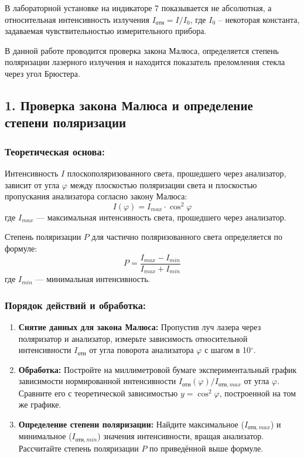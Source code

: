 В лабораторной установке на индикаторе 7 показывается не абсолютная, а относительная интенсивность излучения $I_{\text{отн}} = I/I_0$, где $I_0$ -- некоторая константа, задаваемая чувствительностью измерительного прибора.

\newpage
{}
В данной работе проводится проверка закона Малюса, определяется степень поляризации лазерного излучения и находится показатель преломления стекла через угол Брюстера.

\subsection*{1. Проверка закона Малюса и определение степени поляризации}

\subsubsection*{Теоретическая основа:}
Интенсивность $I$ плоскополяризованного света, прошедшего через анализатор, зависит от угла $\varphi$ между плоскостью поляризации света и плоскостью пропускания анализатора согласно закону Малюса:
\[ I(\varphi) = I_{max} \cdot \cos^2{\varphi} \]
где $I_{max}$ --- максимальная интенсивность света, прошедшего через анализатор.

Степень поляризации $P$ для частично поляризованного света определяется по формуле:
\[ P = \frac{I_{max} - I_{min}}{I_{max} + I_{min}} \]
где $I_{min}$ --- минимальная интенсивность.

\subsubsection*{Порядок действий и обработка:}
\begin{enumerate}
    \item \textbf{Снятие данных для закона Малюса:} Пропустив луч лазера через поляризатор и анализатор, измерьте зависимость относительной интенсивности $I_\text{отн}$ от угла поворота анализатора $\varphi$ с шагом в 10$^\circ$.
    
    \item \textbf{Обработка:} Постройте на миллиметровой бумаге экспериментальный график зависимости нормированной интенсивности $I_\text{отн}(\varphi)/I_{\text{отн}, max}$ от угла $\varphi$. Сравните его с теоретической зависимостью $y = \cos^2{\varphi}$, построенной на том же графике.
    
    \item \textbf{Определение степени поляризации:} Найдите максимальное ($I_{\text{отн}, max}$) и минимальное ($I_{\text{отн}, min}$) значения интенсивности, вращая анализатор. Рассчитайте степень поляризации $P$ по приведённой выше формуле.
\end{enumerate}

